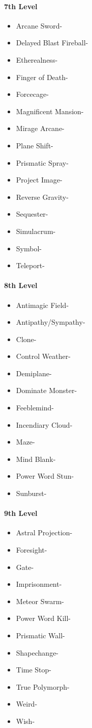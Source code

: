 \documentclass[
]{article}
\providecommand{\tightlist}{%
  \setlength{\itemsep}{0pt}\setlength{\parskip}{0pt}}
\begin{document}
\hypertarget{7th-level-5}{%
\paragraph{7th Level}\label{7th-level-5}}

\begin{itemize}
\tightlist
\item
  Arcane Sword-
\item
  Delayed Blast Fireball-
\item
  Etherealness-
\item
  Finger of Death-
\item
  Forcecage-
\item
  Magnificent Mansion-
\item
  Mirage Arcane-
\item
  Plane Shift-
\item
  Prismatic Spray-
\item
  Project Image-
\item
  Reverse Gravity-
\item
  Sequester-
\item
  Simulacrum-
\item
  Symbol-
\item
  Teleport-
\end{itemize}

\hypertarget{8th-level-5}{%
\paragraph{8th Level}\label{8th-level-5}}

\begin{itemize}
\tightlist
\item
  Antimagic Field-
\item
  Antipathy/Sympathy-
\item
  Clone-
\item
  Control Weather-
\item
  Demiplane-
\item
  Dominate Monster-
\item
  Feeblemind-
\item
  Incendiary Cloud-
\item
  Maze-
\item
  Mind Blank-
\item
  Power Word Stun-
\item
  Sunburst-
\end{itemize}

\hypertarget{9th-level-5}{%
\paragraph{9th Level}\label{9th-level-5}}

\begin{itemize}
\tightlist
\item
  Astral Projection-
\item
  Foresight-
\item
  Gate-
\item
  Imprisonment-
\item
  Meteor Swarm-
\item
  Power Word Kill-
\item
  Prismatic Wall-
\item
  Shapechange-
\item
  Time Stop-
\item
  True Polymorph-
\item
  Weird-
\item
  Wish-
\end{itemize}
\end{document}
